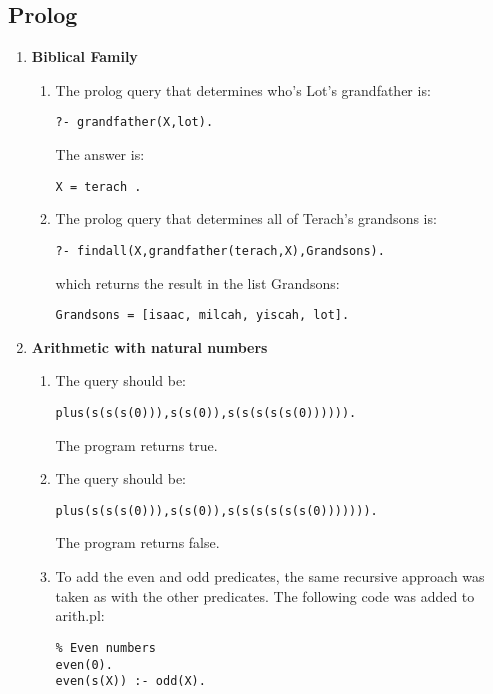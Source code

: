 \documentclass{article}
\begin{document}
\subsection*{Prolog}
\begin{enumerate}
	\item \textbf{Biblical Family}
	\begin{enumerate}
		\item The prolog query that determines who's Lot's 			grandfather is:\\
        \begin{lstlisting}
?- grandfather(X,lot). 
		\end{lstlisting}
		The answer is:
		\begin{lstlisting}
X = terach .
		\end{lstlisting}
        \item The prolog query that determines all of 				Terach's grandsons is:\\         							\begin{lstlisting}
?- findall(X,grandfather(terach,X),Grandsons).
		\end{lstlisting}
        which returns the result in the list Grandsons: 
      	\begin{lstlisting}
Grandsons = [isaac, milcah, yiscah, lot].
		\end{lstlisting}
        
	\end{enumerate}
    \item \textbf{Arithmetic with natural numbers}
    \begin{enumerate}
		\item The query should be:\\
        
        \begin{lstlisting}
plus(s(s(s(0))),s(s(0)),s(s(s(s(s(0)))))).
		\end{lstlisting}
        
        The program returns true.
        \item The query should be:\\ 
        \begin{lstlisting}
plus(s(s(s(0))),s(s(0)),s(s(s(s(s(s(0))))))).
		\end{lstlisting}
        The program returns false.
    \item
    To add the even and odd predicates, the same recursive approach was taken as with the other predicates. The following code was added to arith.pl:
    \begin{lstlisting}
% Even numbers
even(0).
even(s(X)) :- odd(X).


\end{lstlisting}
\end{enumerate}
\end{enumerate}
\end{document}
